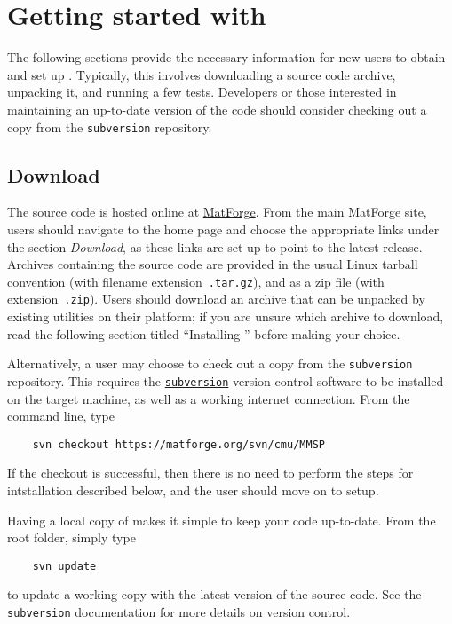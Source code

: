 
\chapter{Getting started with \MMSP}
The following sections provide the necessary information for new users to obtain and set up \MMSP.  Typically, this involves downloading a source code archive, unpacking it, and running a few tests.  Developers or those interested in maintaining an up-to-date version of the code should consider checking out a copy from the {\tt subversion} repository.

\section{Download}
The \MMSP source code is hosted online at \href{https://matforge.org}{MatForge}.  From the main MatForge site, users should navigate to the \MMSP home page and choose the appropriate links under the section {\em Download}, as these links are set up to point to the latest \MMSP release.  Archives containing the \MMSP source code are provided in the usual Linux tarball convention (with filename extension~{\tt .tar.gz}), and as a zip file (with extension~{\tt .zip}).  Users should download an archive that can be unpacked by existing utilities on their platform; if you are unsure which archive to download, read the following section titled ``Installing \MMSP'' before making your choice.

Alternatively, a user may choose to check out a copy from the {\tt subversion} repository.  This requires the \href{http://www.subversion.com}{\tt subversion} version control software to be installed on the target machine, as well as a working internet connection.  From the command line, type
\begin{shadebox}
\begin{verbatim}
    svn checkout https://matforge.org/svn/cmu/MMSP
\end{verbatim}
\end{shadebox}
If the checkout is successful, then there is no need to perform the steps for intstallation described below, and the user should move on to setup.

Having a local copy of \MMSP makes it simple to keep your code up-to-date.  From the root folder, simply type
\begin{shadebox}
\begin{verbatim}
    svn update
\end{verbatim}
\end{shadebox}
to update a working copy with the latest version of the \MMSP source code.  See the {\tt subversion} documentation for more details on version control.

